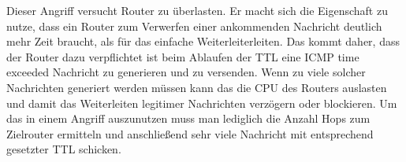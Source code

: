 Dieser Angriff versucht Router zu überlasten. Er macht sich die Eigenschaft zu nutze, dass ein Router zum Verwerfen einer ankommenden Nachricht deutlich mehr Zeit braucht, als für das einfache Weiterleiterleiten. Das kommt daher, dass der Router dazu verpflichtet ist beim Ablaufen der TTL eine ICMP time exceeded Nachricht zu generieren und zu versenden. Wenn zu viele solcher Nachrichten generiert werden müssen kann das die CPU des Routers auslasten und damit das Weiterleiten legitimer Nachrichten verzögern oder blockieren. Um das in einem Angriff auszunutzen muss man lediglich die Anzahl Hops zum Zielrouter ermitteln und anschließend sehr viele Nachricht mit entsprechend gesetzter TTL schicken.